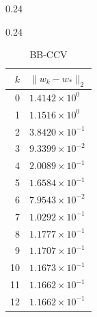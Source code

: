 \documentclass[italian, a4paper, twoside, binding=6mm]{sapthesis}
\begin{document}
\begin{table}[H]
\begin{subtable}{0.24\textwidth}
\end{subtable}\hfill
\begin{subtable}{0.24\textwidth}
\centering
\caption{BB-CCV}
\begin{tabular}{@{}rl@{}}
\toprule
$k$ & $\|w_k-w_*\|_2$\\
\midrule
0 & $1.4142\times10^{0}$\\
1 & $1.1516\times10^{0}$\\
2 & $3.8420\times10^{-1}$\\
3 & $9.3399\times10^{-2}$\\
4 & $2.0089\times10^{-1}$\\
5 & $1.6584\times10^{-1}$\\
6 & $7.9543\times10^{-2}$\\
7 & $1.0292\times10^{-1}$\\
8 & $1.1777\times10^{-1}$\\
9 & $1.1707\times10^{-1}$\\
10 & $1.1673\times10^{-1}$\\
11 & $1.1662\times10^{-1}$\\
12 & $1.1662\times10^{-1}$\\
\bottomrule
\end{tabular}
\end{subtable}
\end{table}
\end{document}
